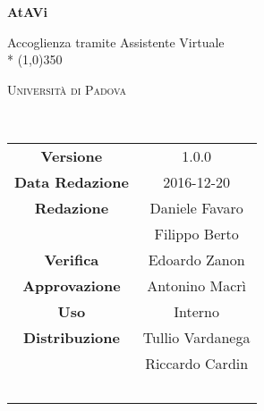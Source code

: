 \documentclass[a4paper,12pt]{article}
\author{Daniele Favaro, Marco Franceschini}
\date{aaaa/mm/gg}
\begin{document}
	\begin{titlepage}
		\centering
		{\huge\bfseries AtAVi\par}
		Accoglienza tramite Assistente Virtuale \\*
		\line(1,0){350} \\
		{\scshape\LARGE Università di Padova \par}
		\vspace{1cm}
		{\scshape\Large \studiodifattibilitai\ \par}
		\logo
		\newpage
		\begin{tabular}{c|c}
			{\hfill \textbf{Versione}} 			& 1.0.0					\\
			{\hfill\textbf{Data Redazione}} 	& 2016-12-20 		\\
			{\hfill\textbf{Redazione}} 			& Daniele Favaro \\ & Filippo Berto \\
			{\hfill\textbf{Verifica}} 		    & Edoardo Zanon 	\\
			{\hfill\textbf{Approvazione}} 		& Antonino Macrì	\\
			{\hfill\textbf{Uso}} 						& Interno 					\\
			{\hfill\textbf{Distribuzione}} 		& Tullio Vardanega\\ & Riccardo Cardin \\ & \kpanic\				\\
		\end{tabular}
	\end{titlepage}
	
	\pagestyle{myfront}
	\newpage
		
	\newpage		
		\tableofcontents

	\label{LastFrontPage}
		\newpage
			\pagestyle{mymain}	
			
		\newpage	
			
		\newpage	
			
		\newpage	
			
		\newpage	
			
		\newpage	
			
		\newpage	
			
	\label{LastPage}
\end{document}
